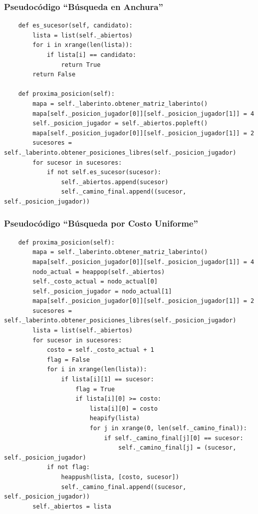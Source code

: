 \documentclass[letter, titlepage, 10pt]{article}
\begin{document}
\subsubsection{Pseudocódigo ``Búsqueda en Anchura''}
\begin{lstlisting}
    def es_sucesor(self, candidato):
        lista = list(self._abiertos)
        for i in xrange(len(lista)):
            if lista[i] == candidato:
                return True
        return False

    def proxima_posicion(self):
        mapa = self._laberinto.obtener_matriz_laberinto()
        mapa[self._posicion_jugador[0]][self._posicion_jugador[1]] = 4
        self._posicion_jugador = self._abiertos.popleft()
        mapa[self._posicion_jugador[0]][self._posicion_jugador[1]] = 2
        sucesores = self._laberinto.obtener_posiciones_libres(self._posicion_jugador)
        for sucesor in sucesores:
            if not self.es_sucesor(sucesor):
                self._abiertos.append(sucesor)
                self._camino_final.append((sucesor, self._posicion_jugador))
\end{lstlisting}

\subsubsection{Pseudocódigo ``Búsqueda por Costo Uniforme''}
\begin{lstlisting}
    def proxima_posicion(self):
        mapa = self._laberinto.obtener_matriz_laberinto()
        mapa[self._posicion_jugador[0]][self._posicion_jugador[1]] = 4
        nodo_actual = heappop(self._abiertos)
        self._costo_actual = nodo_actual[0]
        self._posicion_jugador = nodo_actual[1]
        mapa[self._posicion_jugador[0]][self._posicion_jugador[1]] = 2
        sucesores = self._laberinto.obtener_posiciones_libres(self._posicion_jugador)
        lista = list(self._abiertos)
        for sucesor in sucesores:
            costo = self._costo_actual + 1
            flag = False
            for i in xrange(len(lista)):
                if lista[i][1] == sucesor:
                    flag = True
                    if lista[i][0] >= costo:
                        lista[i][0] = costo
                        heapify(lista)
                        for j in xrange(0, len(self._camino_final)):
                            if self._camino_final[j][0] == sucesor:
                                self._camino_final[j] = (sucesor, self._posicion_jugador)
            if not flag:
                heappush(lista, [costo, sucesor])
                self._camino_final.append((sucesor, self._posicion_jugador))
        self._abiertos = lista
\end{lstlisting}
\end{document}
